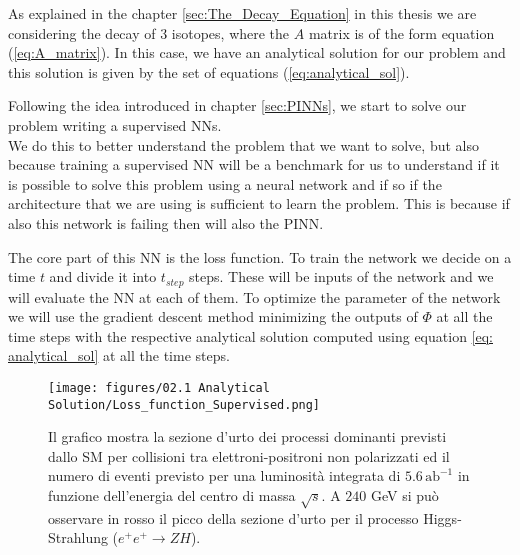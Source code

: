 As explained in the chapter \ref{sec:The_Decay_Equation} in this thesis we are considering the decay of 3 isotopes, where the $A$ matrix is of the form equation (\ref{eq:A_matrix}). In this case, we have an analytical solution for our problem and this solution is given by the set of equations (\ref{eq:analytical_sol}).

Following the idea introduced in chapter \ref{sec:PINNs}, we start to solve our problem writing a supervised NNs.\\
We do this to better understand the problem that we want to solve, but also because training a supervised NN will be a benchmark for us to understand if it is possible to solve this problem using a neural network and if so if the architecture that we are using is sufficient to learn the problem. This is because if also this network is failing then will also the PINN.

The core part of this NN is the loss function. To train the network we decide on a time $t$ and divide it into $t_{step}$ steps. These will be inputs of the network and we will evaluate the NN at each of them. To optimize the parameter of the network we will use the gradient descent method minimizing the outputs of $\Phi$ at all the time steps with the respective analytical solution computed using equation \ref{eq: analytical_sol} at all the time steps.
\begin{figure}
\centering
    \texttt{[image: figures/02.1 Analytical Solution/Loss\_function\_Supervised.png]}
    \caption{Il grafico mostra la sezione d'urto dei processi dominanti previsti dallo SM per collisioni tra elettroni-positroni non polarizzati ed il numero di eventi previsto per una luminosità integrata di $5.6\, \text{ab}^{-1}$ in funzione dell'energia del centro di massa $\sqrt{s}$. A $240$ GeV si può osservare in rosso il picco della sezione d'urto per il processo Higgs-Strahlung ($e^{+}e^{+} \rightarrow ZH$).}
    \label{fig:cross section}
\end{figure}

